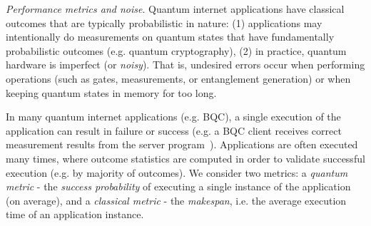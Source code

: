 \textit{Performance metrics and noise}. Quantum internet applications have classical outcomes that are typically probabilistic in nature:
(1) applications may intentionally do measurements on quantum states that have fundamentally probabilistic outcomes (e.g. quantum cryptography),
(2) in practice, quantum hardware is imperfect (or \textit{noisy}). That is, undesired errors occur
when performing operations (such as gates, measurements, or entanglement generation) or when keeping quantum states in memory for too long.

In many quantum internet applications (e.g. BQC), a single execution of the application can result in failure or success (e.g. a BQC client receives correct measurement results from the server program~\cite{leichtle2021verifying}). Applications are often executed many times, where outcome statistics are computed in order to validate successful execution (e.g. by majority of outcomes).
We consider two metrics:
a \emph{quantum metric} -  the \textit{success probability} of executing a single instance of the application (on average), and a \emph{classical metric} -  the \textit{makespan}, i.e. the average execution time of an application instance.
